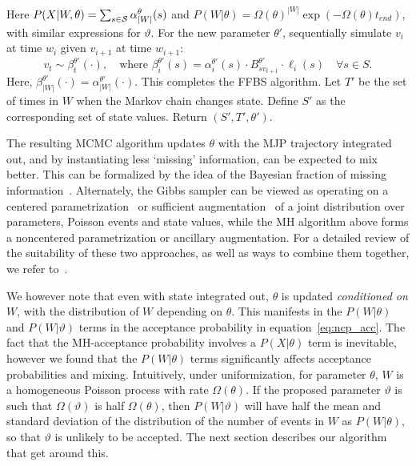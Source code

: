 \begin{algorithm}[H]
\begin{algorithmic}[1]
\begin{align}
          \end{align}
          Here $P(X|W,\theta) = \sum_{s \in {\mathcal S}} \alpha_{|W|}^\theta(s) $ and $P(W|\theta) = \Omega(\theta)^{|W|}\exp(-\Omega(\theta)t_{end})$, with similar expressions for $\vartheta$. 
    \State For the new parameter $\theta'$, sequentially simulate $v_i$ at time $w_i$ given $v_{i+1}$  at 
    time $w_{i+1}$:
    $$ v_t \sim \beta^{\theta'}_t(\cdot),\quad \text{where } 
    \beta^{\theta'}_i(s) = \alpha^{\theta'}_i(s)\cdot B^{\theta'}_{sv_{t+1}} \cdot \ell_i(s) \quad \forall s \in S.$$
    Here, $\beta^{\theta'}_{|W|}(\cdot) = \alpha^{\theta'}_{|W|}(\cdot)$.
    This completes the FFBS algorithm.
    \State Let $T'$ be the set of times in $W$ when the Markov chain changes state. Define $S'$ as the corresponding set of state values. Return $(S', T', \theta')$.
\end{algorithmic}
\end{algorithm}
The resulting MCMC algorithm updates $\theta$ with the MJP trajectory 
integrated out, and by instantiating less `missing' information, can be expected to mix better. 
This can be formalized by the idea of the Bayesian fraction of missing information~\citep{liu1994fraction, papaspiliopoulos2007general}. 
Alternately, the Gibbs sampler can be viewed as operating on a centered parametrization~\citep{papaspiliopoulos2007general} or sufficient augmentation~\citep{yu2011center} of a joint distribution over parameters, Poisson events and state values, while the MH algorithm above forms a noncentered parametrization or ancillary augmentation.
For a detailed review of the suitability of these two approaches, as well as ways to combine them together, we refer to~\citet{papaspiliopoulos2007general, yu2011center}.

We however note that even with state integrated out, $\theta$ is updated {\em conditioned on $W$}, with the distribution of $W$ depending on $\theta$. 
This manifests in the $P(W|\theta)$ and $P(W|\vartheta)$ terms in the acceptance probability in equation~\eqref{eq:ncp_acc}. 
The fact that the MH-acceptance probability involves a $P(X|\theta)$ term is inevitable, however we found that the $P(W|\theta)$ terms significantly affects acceptance probabilities and mixing. 
Intuitively, under uniformization, for parameter $\theta$, $W$ is a homogeneous Poisson process with rate $\Omega(\theta)$. 
If the proposed parameter $\vartheta$ is such that $\Omega(\vartheta)$ is half $\Omega(\theta)$, then $P(W|\vartheta)$ will have half the mean and standard deviation of the distribution of the number of events in $W$ as $P(W|\theta)$, so that $\vartheta$ is unlikely to be accepted. 
The next section describes our algorithm that get around this.
